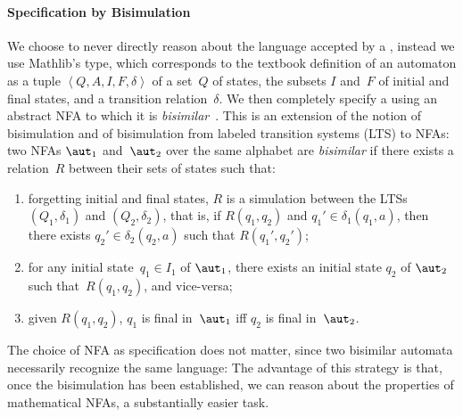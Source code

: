 \paragraph{Specification by Bisimulation}

We choose to never directly reason about the language accepted by a
, instead we use Mathlib's \citep{mathlib}  type, which
corresponds to the textbook definition of an automaton as a tuple $\left<Q, A,
I, F, \delta\right>$ of a set~$Q$ of states, the subsets $I$ and~$F$ of initial
and final states, and a transition relation~$\delta$.
%
We then completely specify a  using an abstract NFA to
which it is \emph{bisimilar}~\cite{kozen-automata-and-computability}.
%
This is an extension of the notion of bisimulation and of bisimulation from
labeled transition systems (LTS) to NFAs: two NFAs $\aut_1$ and~$\aut_2$ over
the same alphabet are \emph{bisimilar} if there exists a relation~$R$ between
their sets of states such that:
\begin{enumerate}
  \item forgetting initial and final states, $R$ is a simulation between the
    LTSs $(Q_1, \delta_1)$ and $(Q_2, \delta_2)$, that is, if $R(q_1, q_2)$ and
    $q_1' \in \delta_1(q_1, a)$, then there exists $q_2' \in \delta_2(q_2, a)$
    such that $R(q_1', q_2')$;
  \item for any initial state~$q_1 \in I_1$ of $\aut_1$, there exists an initial
    state $q_2$ of $\aut_2$ such that~$R(q_1, q_2)$, and vice-versa;
  \item given $R(q_1, q_2)$, $q_1$ is final in~$\aut_1$ iff $q_2$ is final in~$\aut_2$.
\end{enumerate}

The choice of NFA as specification does not matter, since two bisimilar
automata necessarily recognize the same language:
%
The advantage of this strategy is that, once the bisimulation has been
established, we can reason about the properties of mathematical NFAs, a
substantially easier task.

